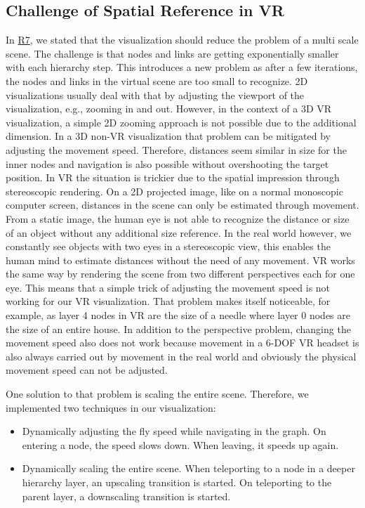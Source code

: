 \subsection{Challenge of Spatial Reference in VR}
\label{chap:ps-spatialReference}
In \hyperref[req:R7]{R7}, we stated that the visualization should reduce the problem of a multi scale scene.
The challenge is that nodes and links are getting exponentially smaller with each hierarchy step.
This introduces a new problem as after a few iterations, the nodes and links in the virtual scene are too small to recognize.
2D visualizations usually deal with that by adjusting the viewport of the visualization, e.g., zooming in and out. 
However, in the context of a 3D VR visualization, a simple 2D zooming approach is not possible due to the additional dimension. 
In a 3D non-VR visualization that problem can be mitigated by adjusting the movement speed. Therefore, distances seem similar in size for the inner nodes and navigation is also possible without overshooting the target position. 
In VR the situation is trickier due to the spatial impression through stereoscopic rendering. On a 2D projected image, like on a normal monoscopic computer screen, distances in the scene can only be estimated through movement. From a static image, the human eye is not able to recognize the distance or size of an object without any additional size reference. 
In the real world however, we constantly see objects with two eyes in a stereoscopic view, this enables the human mind to estimate distances without the need of any movement. VR works the same way by rendering the scene from two different perspectives each for one eye.  
This means that a simple trick of adjusting the movement speed is not working for our VR visualization.
That problem makes itself noticeable, for example, as layer 4 nodes in VR are the size of a needle where layer 0 nodes are the size of an entire house.
In addition to the perspective problem, changing the movement speed also does not work because movement in a 6-DOF VR headset is also always carried out by movement in the real world and obviously the physical movement speed can not be adjusted.

One solution to that problem is scaling the entire scene. Therefore, we implemented two techniques in our visualization:
\begin{itemize}
    \item Dynamically adjusting the fly speed while navigating in the graph. On entering a node, the speed slows down. When leaving, it speeds up again. 
    \item Dynamically scaling the entire scene. When teleporting to a node in a deeper hierarchy layer, an upscaling transition is started. On teleporting to the parent layer, a downscaling transition is started. 
\end{itemize}

